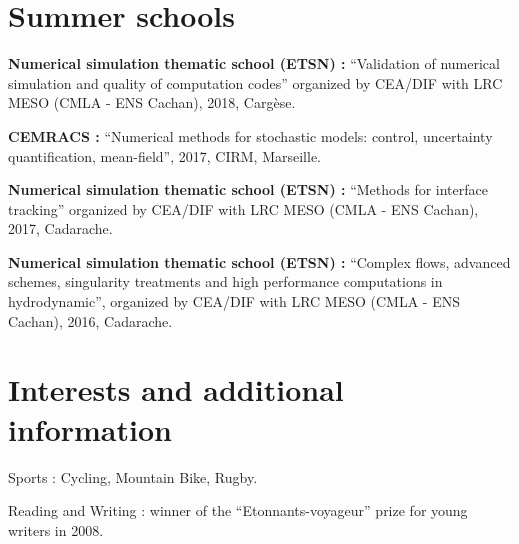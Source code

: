 \documentclass{article}
\renewenvironment{itemize}{
  \begin{list}{}{
      \setlength{\leftmargin}{1.5em}
      \setlength{\itemsep}{0.25em}
      \setlength{\parskip}{0pt}
      \setlength{\parsep}{0.25em}
    }
}{
  \end{list}
}
\begin{document}
\section*{Summer schools}
\begin{itemize}
	\item \textbf{Numerical simulation thematic school (ETSN) :} ``Validation of numerical simulation and quality of computation codes'' organized by CEA/DIF with LRC MESO (CMLA - ENS Cachan), 2018, Cargèse.
	\item \textbf{CEMRACS :} ``Numerical methods for stochastic models: control, uncertainty quantification, mean-field'', 2017, CIRM, Marseille.
	\item \textbf{Numerical simulation thematic school (ETSN) :} ``Methods for interface tracking'' organized by CEA/DIF with LRC MESO (CMLA - ENS Cachan), 2017, Cadarache.
	\item \textbf{Numerical simulation thematic school (ETSN) :} ``Complex flows, advanced schemes, singularity treatments and high performance computations in hydrodynamic'', organized by CEA/DIF with LRC MESO (CMLA - ENS Cachan), 2016, Cadarache.
\end{itemize}  

\section*{Interests and additional information}
\begin{itemize}
	\item Sports : Cycling, Mountain Bike, Rugby.
	\item Reading and Writing : winner of the ``Etonnants-voyageur'' prize for young writers in 2008.
\end{itemize}  
\end{document}

